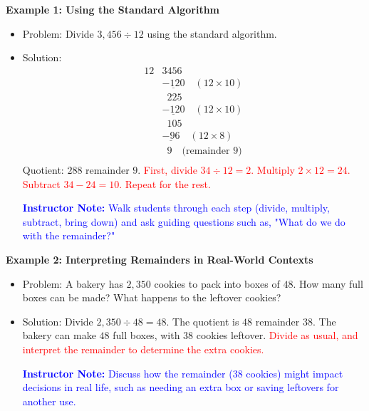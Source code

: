 \documentclass[12pt]{article}
\begin{document}
\vspace{1em}

\begin{tcolorbox}[colframe=black!60, colback=white, 
coltitle=black, colbacktitle=black!15, fonttitle=\bfseries\Large, 
title=Examples, halign title=center, left=10pt, right=10pt, top=10pt, bottom=15pt]
\textbf{Example 1: Using the Standard Algorithm}
\begin{itemize}
    \item Problem: Divide \( 3,456 \div 12 \) using the standard algorithm.
    \item Solution:
    \[
    \begin{array}{r|l}
        12 & 3456 \\
           & \underline{-120} \quad (12 \times 10) \\
           & \phantom{3}225 \\
           & \underline{-120} \quad (12 \times 10) \\
           & \phantom{3}105 \\
           & \underline{-96} \quad (12 \times 8) \\
           & \phantom{3}9 \quad \text{(remainder 9)} \\
    \end{array}
    \]
    Quotient: \( 288 \) remainder \( 9 \). \textcolor{red}{First, divide \( 34 \div 12 = 2 \). Multiply \( 2 \times 12 = 24 \). Subtract \( 34 - 24 = 10 \). Repeat for the rest.}

    \textcolor{blue}{\textbf{Instructor Note:} Walk students through each step (divide, multiply, subtract, bring down) and ask guiding questions such as, "What do we do with the remainder?"}
\end{itemize}

\textbf{Example 2: Interpreting Remainders in Real-World Contexts}
\begin{itemize}
    \item Problem: A bakery has \( 2,350 \) cookies to pack into boxes of \( 48 \). How many full boxes can be made? What happens to the leftover cookies?
    \item Solution: Divide \( 2,350 \div 48 = 48 \). The quotient is \( 48 \) remainder \( 38 \). The bakery can make \( 48 \) full boxes, with \( 38 \) cookies leftover. \textcolor{red}{Divide as usual, and interpret the remainder to determine the extra cookies.}

    \textcolor{blue}{\textbf{Instructor Note:} Discuss how the remainder (38 cookies) might impact decisions in real life, such as needing an extra box or saving leftovers for another use.}
\end{itemize}


\end{tcolorbox}
\end{document}
